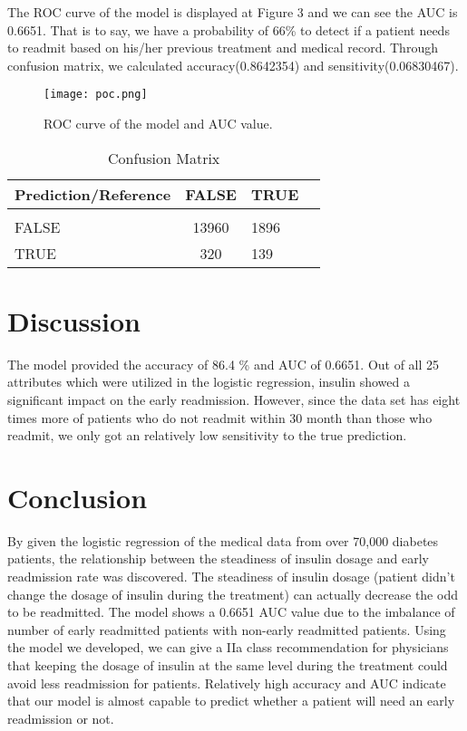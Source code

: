 \documentclass[twoside,11pt]{article}
\begin{document}
The ROC curve of the model is displayed at Figure 3 and we can see the AUC is 0.6651. That is to say, we have a probability of 66\% to detect if a patient needs to readmit based on his/her previous treatment and medical record. Through confusion matrix, we calculated accuracy(0.8642354) and sensitivity(0.06830467).




\begin{figure}[htbp]
  \centering 
  \texttt{[image: poc.png]} 
  \caption{ROC curve of the model and AUC value.}
  \label{fig:example} 
\end{figure} 
 
\begin{table}[htbp]
  \centering 
  \begin{tabular}{lclc} 
    Prediction/Reference  & FALSE & TRUE  \\ 
    \hline \\[-11pt]
    FALSE & 13960 & 1896\\ 
    TRUE & 320 & 139\\ \hline 
  \end{tabular}
  \label{tab:example} 
    \caption{Confusion Matrix} 
\end{table}

\section{Discussion} 
The model provided the accuracy of 86.4 \% and AUC of 0.6651. Out of all 25 attributes which were utilized in the logistic regression, insulin showed a significant impact on the early readmission. However, since the data set has eight times more of patients who do not readmit within 30 month than those who readmit, we only got an relatively low sensitivity to the true prediction. 


\section{Conclusion} 
By given the logistic regression of the medical data from over 70,000 diabetes patients, the relationship between the steadiness of insulin dosage and early readmission rate was discovered. The steadiness of insulin dosage (patient didn't change the dosage of insulin during the treatment) can actually decrease the odd to be readmitted. The model shows a 0.6651 AUC value due to the imbalance of number of early readmitted patients with non-early readmitted patients. Using the model we developed, we can give a IIa class recommendation for physicians that keeping the dosage of insulin at the same level during the treatment could avoid less readmission for patients. Relatively high accuracy and AUC indicate that our model is almost capable to predict whether a patient will need an early readmission or not. 
\end{document}
